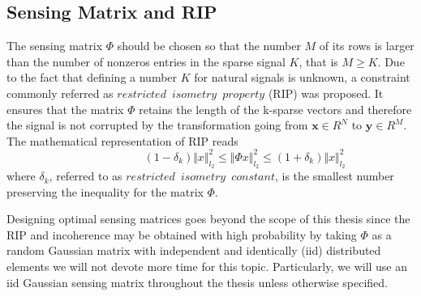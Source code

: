 \subsection{Sensing Matrix and RIP}
The sensing matrix $\Phi$ should be chosen so that the number $M$ of its rows is larger than the number of nonzeros entries in the sparse signal $K$, that is $M \geq K$. Due to the fact that defining a number $K$ for natural signals is unknown, a constraint commonly referred as $restricted \enspace isometry \enspace property$ (RIP) \cite{candes2005decoding,candes2006stable,candes2008restricted} was proposed. It ensures that the matrix $\Phi$ retains the length of the k-sparse vectors and therefore the signal is not corrupted  by the transformation going from $\mathbf{x} \in R^N $ to $\mathbf{y} \in R^M $. The mathematical representation of RIP reads
\begin{equation} \label{eq:rip1}
\hspace{3em} \hspace{3em} \hspace{3em} (1-\delta_k)\Vert x \Vert_{l_2}^2 \leq \Vert \Phi x \Vert_{l_2}^2 \leq (1+\delta_k)\Vert x \Vert_{l_2}^2  \hspace{3em}
\end{equation}  
where $\delta_k$, referred to as $restricted \enspace isometry \enspace constant$, is the smallest number preserving the inequality for the matrix $\Phi$. \

Designing optimal sensing matrices goes beyond the scope of this thesis since the RIP and incoherence may be obtained with high probability by taking $\Phi$ as a random Gaussian matrix with independent and identically (iid) distributed elements\cite{candes2005signal} we will not devote more time for this topic. Particularly, we will use an iid Gaussian sensing matrix throughout the thesis unless otherwise specified.         

